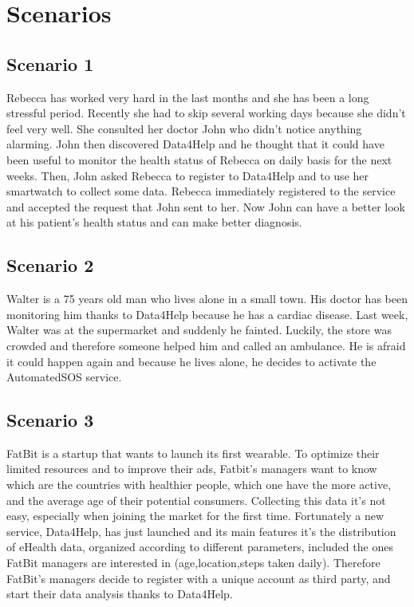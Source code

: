\section{Scenarios}
\subsection{Scenario 1}

Rebecca has worked very hard in the last months and she has been a long stressful period. Recently she had to skip several working days because she didn't feel very well. 
She consulted her doctor John who didn't notice anything alarming.
John then discovered Data4Help and he thought that it could have been useful to monitor the health status of Rebecca on daily basis for the next weeks.
Then, John asked Rebecca to register to Data4Help and to use her smartwatch to collect some data.
Rebecca immediately registered to the service and accepted the request that John sent to her.
Now John can have a better look at his patient's health status and can make better diagnosis.


\subsection{Scenario 2}
Walter is a 75 years old man who lives alone in a small town.
His doctor has been monitoring him thanks to Data4Help because he has a cardiac disease.
Last week, Walter was at the supermarket and suddenly he fainted. Luckily, the store was crowded and therefore someone helped him and called an ambulance.
He is afraid it could happen again and because he lives alone, he decides to activate the AutomatedSOS service.


\subsection{Scenario 3}
FatBit is a startup that wants to launch its first wearable. To optimize their limited resources and to improve their ads, Fatbit's managers want to know which are the countries with healthier people, which one have the more active, and the average age of their potential consumers. Collecting this data it's not easy, especially when joining the market for the first time. Fortunately a new service, Data4Help, has just launched and its main features it's the distribution of eHealth data, organized according to different parameters, included the ones FatBit managers are interested in (age,location,steps taken daily).
Therefore FatBit's managers decide to register with a unique account as third party, and start their data analysis thanks to Data4Help.


